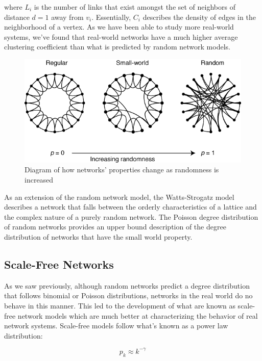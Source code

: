 \documentclass{article}
\begin{document}
where $L_i$ is the number of links that exist amongst the set of neighbors of distance $d=1$ away from $v_i$.  Essentially, $C_i$ describes the density of edges in the neighborhood of a vertex.  As we have been able to study more real-world systems, we've found that real-world networks have a much higher average clustering coefficient than what is predicted by random network models. 


\begin{figure}[h]
    \center
    \includegraphics[scale=0.40]{smallworld}
    \caption{Diagram of how networks' properties change as randomness is increased  \cite{smallworld}}
    \label{fig:smallworld}
\end{figure}

As an extension of the random network model, the Watts-Strogatz model describes a network that falls between the orderly characteristics of a lattice and the complex nature of a purely random network.  The Poisson degree distribution of random networks provides an upper bound description of the degree distribution of networks that have the small world property.

\subsection{Scale-Free Networks}

As we saw previously, although random networks predict a degree distribution that follows binomial or Poisson distributions, networks in the real world do no behave in this manner. This led to the development of what are known as scale-free network models which are much better at characterizing the behavior of real network systems. Scale-free models follow what's known as a power law distribution:

\begin{equation}\label{eq:power}
    p_k \approx k^{- \gamma }
\end{equation}
\end{document}
